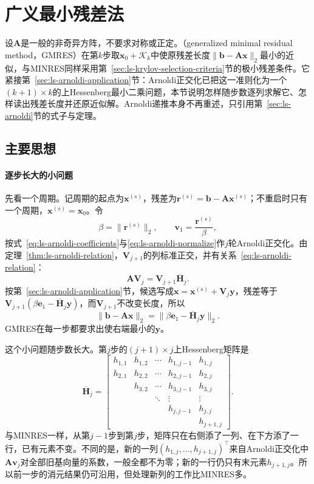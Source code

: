 \section{广义最小残差法}
\label{sec:ls-gmres}

设$\bm A$是一般的非奇异方阵，不要求对称或正定。（generalized minimal residual method，GMRES）在第$k$步取$\bm x_0+\mathcal K_k$中使原残差长度$\lVert\bm b-\bm A\bm x\rVert_2$最小的近似，与MINRES同样采用第~\ref{sec:ls-krylov-selection-criteria}节的极小残差条件。它紧接第~\ref{sec:ls-arnoldi-application}节：Arnoldi正交化已把这一准则化为一个$(k+1)\times k$的上Hessenberg最小二乘问题，本节说明怎样随步数逐列求解它、怎样读出残差长度并还原近似解。Arnoldi递推本身不再重述，只引用第~\ref{sec:ls-arnoldi}节的式子与定理。

\subsection{主要思想}

\paragraph{逐步长大的小问题}
先看一个周期。记周期的起点为$\bm x^{(s)}$，残差为$\bm r^{(s)}=\bm b-\bm A\bm x^{(s)}$；不重启时只有一个周期，$\bm x^{(s)}=\bm x_0$。令
\begin{equation}
 \beta=\lVert\bm r^{(s)}\rVert_2,\qquad \bm v_1=\frac{\bm r^{(s)}}{\beta},
 \label{eq:ls-gmres-start}
\end{equation}
按式~\eqref{eq:ls-arnoldi-coefficients}与\eqref{eq:ls-arnoldi-normalize}作$j$轮Arnoldi正交化。由定理~\ref{thm:ls-arnoldi-relation}，$\bm V_{j+1}$的列标准正交，并有关系~\eqref{eq:ls-arnoldi-relation}：
\[
 \bm A\bm V_j=\bm V_{j+1}\overline{\bm H}_j .
\]
按第~\ref{sec:ls-arnoldi-application}节，候选写成$\bm x=\bm x^{(s)}+\bm V_j\bm y$，残差等于$\bm V_{j+1}(\beta\bm e_1-\overline{\bm H}_j\bm y)$，而$\bm V_{j+1}$不改变长度，所以
\begin{equation}
 \lVert\bm b-\bm A\bm x\rVert_2=\lVert\beta\bm e_1-\overline{\bm H}_j\bm y\rVert_2 .
 \label{eq:ls-gmres-small-problem}
\end{equation}
GMRES在每一步都要求出使右端最小的$\bm y$。

这个小问题随步数长大。第$j$步的$(j+1)\times j$上Hessenberg矩阵是
\[
 \overline{\bm H}_j=
 \begin{bmatrix}
 h_{1,1}&h_{1,2}&\cdots&h_{1,j-1}&h_{1,j}\\
 h_{2,1}&h_{2,2}&\cdots&h_{2,j-1}&h_{2,j}\\
 &h_{3,2}&\cdots&h_{3,j-1}&h_{3,j}\\
 &&\ddots&\vdots&\vdots\\
 &&&h_{j,j-1}&h_{j,j}\\
 &&&&h_{j+1,j}
 \end{bmatrix}.
\]
与MINRES一样，从第$j-1$步到第$j$步，矩阵只在右侧添了一列、在下方添了一行，已有元素不变。不同的是，新的一列$(h_{1,j},\ldots,h_{j+1,j})^\top$来自Arnoldi正交化中$\bm A\bm v_j$对全部旧基向量的系数，一般全都不为零；新的一行仍只有末元素$h_{j+1,j}$。所以前一步的消元结果仍可沿用，但处理新列的工作比MINRES多。

